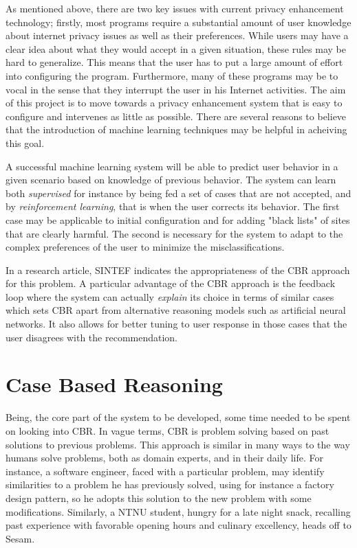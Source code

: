 As mentioned above, there are two key issues with current privacy enhancement technology; firstly, most programs require a substantial amount of user knowledge about internet privacy issues as well as their preferences. While users may have a clear idea about what they would accept in a given situation, these rules may be hard to generalize. This means that the user has to put a large amount of effort into configuring the program. Furthermore, many of these programs may be to vocal in the sense that they interrupt the user in his Internet activities. The aim of this project is to move towards a privacy enhancement system that is easy to configure and intervenes as little as possible. There are several reasons to believe that the introduction of machine learning techniques may be helpful in acheiving this goal.

A successful machine learning system will be able to predict user behavior in a given scenario based on knowledge of previous behavior. The system can learn both \emph{supervised} for instance by being fed a set of cases that are not accepted, and by \emph{reinforcement learning}, that is when the user corrects its behavior. The first case may be applicable to initial configuration and for adding "black lists" of sites that are clearly harmful. The second is necessary for the system to adapt to the complex preferences of the user to minimize the misclassifications.

In a research article, SINTEF indicates the appropriateness of the CBR approach for this problem. A particular advantage of the CBR approach is the feedback loop where the system can actually \emph{explain} its choice in terms of similar cases which sets CBR apart from alternative reasoning models such as artificial neural networks. It also allows for better tuning to user response in those cases that the user disagrees with the recommendation.

\section{Case Based Reasoning}
Being, the core part of the system to be developed, some time needed to be spent on looking into CBR. In vague terms, CBR is problem solving based on past solutions to previous problems. This approach is similar in many ways to the way humans solve problems, both as domain experts, and in their daily life. For instance, a software engineer, faced with a particular problem, may identify similarities to a problem he has previously solved, using for instance a factory design pattern, so he adopts this solution to the new problem with some modifications. Similarly, a NTNU student, hungry for a late night snack, recalling past experience with favorable opening hours and culinary excellency, heads off to Sesam.

